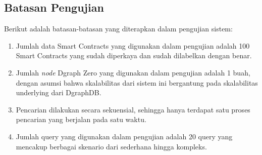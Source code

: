 \subsection{Batasan Pengujian}

Berikut adalah batasan-batasan yang diterapkan dalam pengujian sistem:
\begin{enumerate}
	\item Jumlah data Smart Contracts yang digunakan dalam pengujian adalah 100 Smart Contracts yang sudah diperkaya dan sudah dilabelkan dengan benar.
	\item Jumlah \textit{node} Dgraph Zero yang digunakan dalam pengujian adalah 1 buah, dengan asumsi bahwa skalabilitas dari sistem ini bergantung pada skalabilitas underlying dari DgraphDB.
	\item Pencarian dilakukan secara sekuensial, sehingga hanya terdapat satu proses pencarian yang berjalan pada satu waktu.
	\item Jumlah query yang digunakan dalam pengujian adalah 20 query yang mencakup berbagai skenario dari sederhana hingga kompleks.
\end{enumerate}